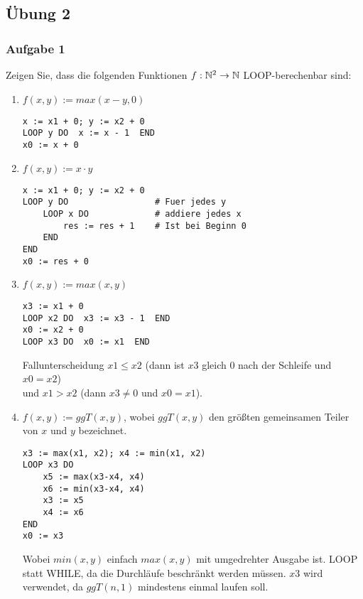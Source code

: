 
\newpage
\subsection*{Übung 2}
\subsubsection*{Aufgabe 1}
Zeigen Sie, dass die folgenden Funktionen $f: \mathbb{N}^{2} \to \mathbb{N}$ LOOP-berechenbar sind:

    \begin{enumerate}
        \item $f(x,y) := max(x-y, 0)$
            \begin{lstlisting}
x := x1 + 0; y := x2 + 0
LOOP y DO  x := x - 1  END
x0 := x + 0
            \end{lstlisting}

        \item $f(x,y) := x \cdot y$
            \begin{lstlisting}
x := x1 + 0; y := x2 + 0
LOOP y DO                 # Fuer jedes y
    LOOP x DO             # addiere jedes x
        res := res + 1    # Ist bei Beginn 0
    END
END
x0 := res + 0
            \end{lstlisting}

        \item $f(x,y) := max(x,y)$
            \begin{lstlisting}
x3 := x1 + 0
LOOP x2 DO  x3 := x3 - 1  END
x0 := x2 + 0
LOOP x3 DO  x0 := x1  END
            \end{lstlisting}

            Fallunterscheidung $x1 \leq x2$ (dann ist $x3$ gleich $0$ nach der Schleife und $x0 = x2$) \\ und $x1 > x2$ (dann $x3 \neq 0$ und $x0 = x1$).

        \item $f(x,y) := ggT(x,y)$, wobei $ggT(x,y)$ den größten gemeinsamen Teiler von $x$ und $y$ bezeichnet.
            \begin{lstlisting}
x3 := max(x1, x2); x4 := min(x1, x2)
LOOP x3 DO
    x5 := max(x3-x4, x4)
    x6 := min(x3-x4, x4)
    x3 := x5
    x4 := x6
END
x0 := x3
            \end{lstlisting}

            Wobei $min(x,y)$ einfach $max(x, y)$ mit umgedrehter Ausgabe ist. LOOP statt WHILE, da die Durchläufe beschränkt werden müssen. $x3$ wird verwendet, da $ggT(n,1)$ mindestens einmal laufen soll.
    \end{enumerate}



